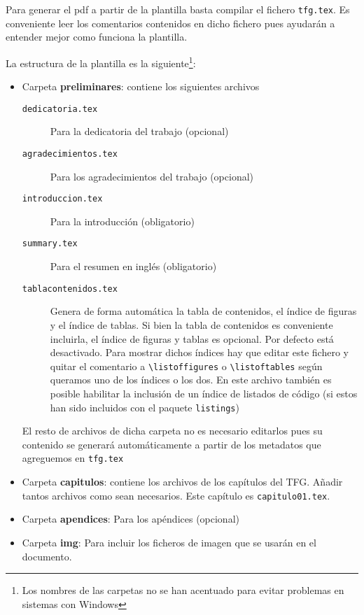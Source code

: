 Para generar el pdf a partir de la plantilla basta compilar el fichero \texttt{tfg.tex}. Es conveniente leer los comentarios contenidos en dicho fichero pues ayudarán a entender mejor como funciona la plantilla. 

La estructura de la plantilla es la siguiente\footnote{Los nombres de las carpetas no se han acentuado para evitar problemas en sistemas con Windows}: 
\begin{itemize}
  \item Carpeta \textbf{preliminares}: contiene los siguientes archivos
    \begin{description}
      \item[\texttt{dedicatoria.tex}] Para la dedicatoria del trabajo (opcional)
      \item[\texttt{agradecimientos.tex}] Para los agradecimientos del trabajo (opcional)
      \item[\texttt{introduccion.tex}] Para la introducción (obligatorio)
      \item[\texttt{summary.tex}] Para el resumen en inglés (obligatorio)
      \item[\texttt{tablacontenidos.tex}] Genera de forma automática la tabla de contenidos, el índice de figuras y el índice de tablas. Si bien la tabla de contenidos es conveniente incluirla, el índice de figuras y tablas es opcional. Por defecto está desactivado. Para mostrar dichos índices hay que editar este fichero y quitar el comentario a \verb+\listoffigures+ o \verb+\listoftables+ según queramos uno de los índices o los dos. En este archivo también es posible habilitar la inclusión de un índice de listados de código (si estos han sido incluidos con el paquete \texttt{listings})
  \end{description}
  El resto de archivos de dicha carpeta no es necesario editarlos pues su contenido se generará automáticamente a partir de los metadatos que agreguemos en \texttt{tfg.tex}

  \item Carpeta \textbf{capitulos}: contiene los archivos de los capítulos del TFG. Añadir tantos archivos como sean necesarios. Este capítulo es \texttt{capitulo01.tex}.

  \item Carpeta \textbf{apendices}: Para los apéndices (opcional)
  \item Carpeta \textbf{img}: Para incluir los ficheros de imagen que se usarán en el documento.
    

\end{itemize}
